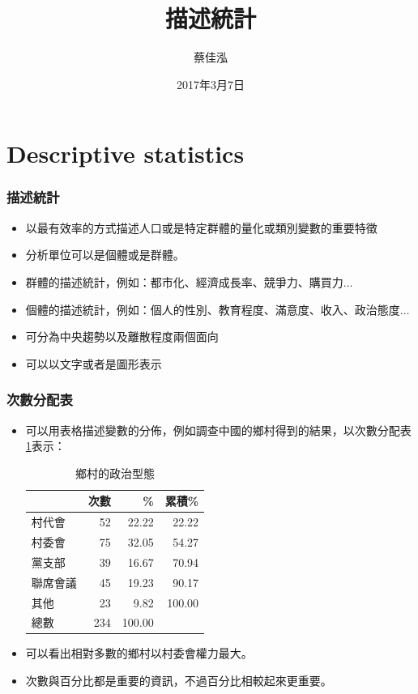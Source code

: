\documentclass{beamer}
\author[蔡佳泓]{蔡佳泓}
\title[Statistical Methods for Social Sciences]{描述統計}
\date[2017/3/7]{2017年3月7日} %
\institute[]{國立政治大學東亞所暨選舉研究中心}
\begin{document}
\maketitle
\tableofcontents
\section{Descriptive statistics}  %

\begin{frame} \frametitle{描述統計}
  \begin{itemize}
  \item 以最有效率的方式描述人口或是特定群體的量化或類別變數的重要特徵
\item 分析單位可以是個體或是群體。
\item 群體的描述統計，例如：都市化、經濟成長率、競爭力、購買力$\ldots$
\item 個體的描述統計，例如：個人的性別、教育程度、滿意度、收入、政治態度$\ldots$
\item 可分為中央趨勢以及離散程度兩個面向
\item 可以以文字或者是圖形表示
\end{itemize}
\end{frame}
\begin{frame} \frametitle{次數分配表}
\begin{itemize}
  \item 可以用表格描述變數的分佈，例如調查中國的鄉村得到的結果，以次數分配表\ref{tab:county}表示：

  \begin{table}
  \caption{鄉村的政治型態}
\label{tab:county}
  \begin{tabular}{lrrr}
  \hline
  &次數&\% & 累積\%\\
 \hline
  村代會&52&22.22&22.22\\
  村委會&75&32.05&54.27\\
  黨支部&39&16.67&70.94\\
  聯席會議&45&19.23&90.17\\
  其他&23&9.82&100.00\\
  \hline
  總數&234&100.00\\
\end{tabular}
\end{table}
\item 可以看出相對多數的鄉村以村委會權力最大。
\item 次數與百分比都是重要的資訊，不過百分比相較起來更重要。
 \end{itemize}
\end{frame}
\end{document}
